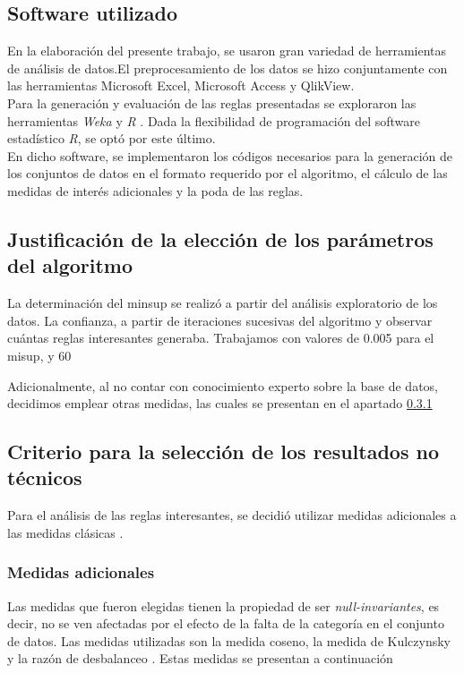 \documentclass[]{article}
\begin{document}
	
	
	\subsection{Software utilizado}
	En la elaboración del presente trabajo, se usaron gran variedad de herramientas de análisis de datos.El preprocesamiento de los datos se hizo conjuntamente con las herramientas Microsoft Excel, Microsoft Access y QlikView.\\
	
	Para la generación y evaluación de las reglas presentadas se exploraron las herramientas \textit{Weka} \cite{Weka1} y \textit{R} \cite{RCran}. Dada la flexibilidad de programación del software estadístico \textit{R}, se optó por este último.\\
	
	En dicho software, se implementaron los códigos necesarios para la generación de los conjuntos de datos en el formato requerido por el algoritmo, el cálculo de las medidas de interés adicionales y la poda de las reglas.
	
	\subsection{Justificación de la elección de los parámetros del algoritmo}
	La determinación del minsup se realizó a partir del análisis exploratorio de los datos. La confianza, a partir de iteraciones sucesivas del algoritmo y observar cuántas reglas interesantes generaba. Trabajamos con valores de 0.005 para el misup, y 60%
	
	Adicionalmente, al no contar con conocimiento experto sobre la base de datos, decidimos emplear otras medidas, las cuales se presentan en el apartado \ref{Medidas} 
	
	\subsection{Criterio para la selección de los resultados no técnicos}
	
	Para el análisis de las reglas interesantes, se decidió utilizar medidas adicionales a las medidas clásicas \cite{Tan:2005:IDM:1095618}.
	
	\subsubsection{Medidas adicionales} \label{Medidas}
	Las medidas que fueron elegidas tienen la propiedad de ser \textit{null-invariantes}, es decir, no se ven afectadas por el efecto de la falta de la categoría en el conjunto de datos. Las medidas utilizadas son la medida coseno, la medida de Kulczynsky y la razón de desbalanceo \cite{Hall:2009:WDM:1656274.1656278}. Estas medidas se presentan a continuación\\
	
\end{document}
